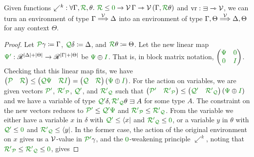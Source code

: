\begin{lemma}\label{thm:lr-bind}
  Given functions
  ${\swarrow^k} : \forall \Gamma, \grR, \theta.~\grR \leq \gr0 \to
  \V\,\Gamma \rightarrowtriangle \V\,\plr{\Gamma, \grR\theta}$ and
  $\mathrm{vr} : {\sqni} \rightarrowtriangle \V$, we can turn an environment of
  type $\Gamma \stackrel{\mathcal V}\Longrightarrow \Delta$ into an environment of type
  $\Gamma, \Theta \stackrel{\mathcal V}\Longrightarrow \Delta, \Theta$ for any context $\Theta$.
\end{lemma}
\begin{proof}
  Let $\grP\gamma \coloneqq \Gamma$, $\grQ\delta \coloneqq \Delta$, and
  $\grR\theta \coloneqq \Theta$.
  Let the new linear map $\gr\Psi\gr' : \Ann^{\size\Delta + \size\Theta} \to
  \Ann^{\size\Gamma + \size\Theta}$ be $\gr\Psi \oplus \gr I$.
  That is, in block matrix notation,
  $\begin{pmatrix} \gr\Psi & \gr0 \\ \gr0 & \gr I \end{pmatrix}$.
  Checking that this linear map fits, we have
  $\begin{pmatrix}\grP & \grR\end{pmatrix}
  \leq \begin{pmatrix}\grQ\gr\Psi & \grR\gr I\end{pmatrix}
  = \begin{pmatrix}\grQ & \grR\end{pmatrix}\plr{\gr\Psi \oplus \gr I}$.
  For the action on variables, we are given vectors $\grPprime$,
  $\grR\gr'_\grP$, $\grQprime$, and $\grR\gr'_\grQ$ such that
  $\begin{pmatrix} \grPprime & \grR\gr'_\grP \end{pmatrix} \leq
  \begin{pmatrix} \grQprime & \grR\gr'_\grQ \end{pmatrix}
  \plr{\gr\Psi \oplus \gr I}$ and we have a variable of type
  $\grQprime\delta, \grR\gr'_\grQ\theta \sqni A$ for some type $A$.
  The constraint on the new vectors reduces to $\grPprime \leq \grQprime\gr\Psi$
  and $\grR\gr'_\grP \leq \grR\gr'_\grQ$.
  From the variable we either have a variable $x$ in $\delta$ with
  $\grQprime \leq \langle x \rvert$ and $\grR\gr'_\grQ \leq \gr0$, or a
  variable $y$ in $\theta$ with $\grQprime \leq \gr0$ and
  $\grR\gr'_\grQ \leq \langle y \rvert$.
  In the former case, the action of the original environment on $x$ gives us a
  $\mathcal V$-value in $\grPprime\gamma$, and the $\gr0$-weakening principle
  $\swarrow^k$, noting that $\grR\gr'_\grP \leq \grR\gr'_\grQ \leq \gr0$, gives

\end{proof}
